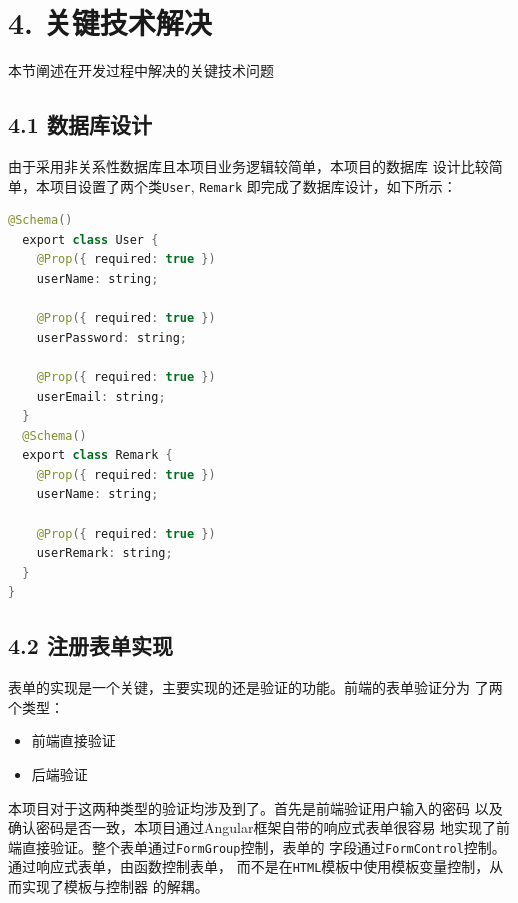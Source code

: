 \documentclass[a4paper,12pt, centering]{ctexart}
\begin{document}
  \section*{4. 关键技术解决}

  本节阐述在开发过程中解决的关键技术问题

  \subsection*{4.1 数据库设计}

  由于采用非关系性数据库且本项目业务逻辑较简单，本项目的数据库
  设计比较简单，本项目设置了两个类\verb|User|, \verb|Remark|
  即完成了数据库设计，如下所示：

  \begin{lstlisting}[language=java, caption=数据库设计]
  @Schema()
  export class User {
    @Prop({ required: true })
    userName: string;

    @Prop({ required: true })
    userPassword: string;

    @Prop({ required: true })
    userEmail: string;
  }
  @Schema()
  export class Remark {
    @Prop({ required: true })
    userName: string;
    
    @Prop({ required: true })
    userRemark: string;
  }
}
  \end{lstlisting}

  \subsection*{4.2 注册表单实现}

  表单的实现是一个关键，主要实现的还是验证的功能。前端的表单验证分为
  了两个类型：

  \begin{itemize}
    \item 前端直接验证
    \item 后端验证
  \end{itemize}

  本项目对于这两种类型的验证均涉及到了。首先是前端验证用户输入的密码
  以及确认密码是否一致，本项目通过Angular框架自带的响应式表单很容易
  地实现了前端直接验证。整个表单通过\verb|FormGroup|控制，表单的
  字段通过\verb|FormControl|控制。通过响应式表单，由函数控制表单，
  而不是在\verb|HTML|模板中使用模板变量控制，从而实现了模板与控制器
  的解耦。
\end{document}
